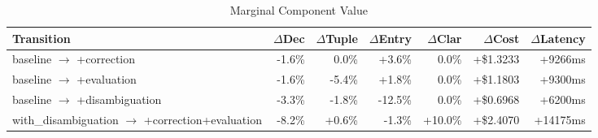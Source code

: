 \begin{table}[htbp]
\centering
\caption{Marginal Component Value}
\label{tab:marginal-deltas}
\begin{tabular}{l rrrr rr}
\toprule
Transition & $\Delta$Dec & $\Delta$Tuple & $\Delta$Entry & $\Delta$Clar & $\Delta$Cost & $\Delta$Latency \\
\midrule
  baseline $\to$ +correction & -1.6\% & 0.0\% & +3.6\% & 0.0\% & +\$1.3233 & +9266ms \\
  baseline $\to$ +evaluation & -1.6\% & -5.4\% & +1.8\% & 0.0\% & +\$1.1803 & +9300ms \\
  baseline $\to$ +disambiguation & -3.3\% & -1.8\% & -12.5\% & 0.0\% & +\$0.6968 & +6200ms \\
  with\_disambiguation $\to$ +correction+evaluation & -8.2\% & +0.6\% & -1.3\% & +10.0\% & +\$2.4070 & +14175ms \\
\bottomrule
\end{tabular}
\end{table}
